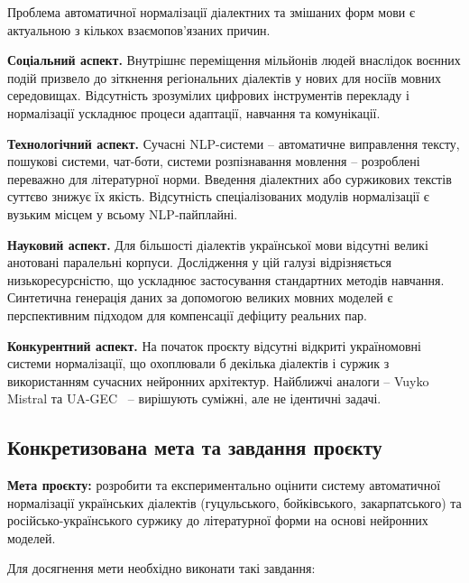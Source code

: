 \documentclass[14pt]{extarticle}
\begin{document}
Проблема автоматичної нормалізації діалектних та змішаних форм мови є актуальною з кількох взаємопов'язаних причин.

\textbf{Соціальний аспект.} Внутрішнє переміщення мільйонів людей внаслідок воєнних подій призвело до зіткнення регіональних діалектів у нових для носіїв мовних середовищах. Відсутність зрозумілих цифрових інструментів перекладу і нормалізації ускладнює процеси адаптації, навчання та комунікації.

\textbf{Технологічний аспект.} Сучасні NLP-системи -- автоматичне виправлення тексту, пошукові системи, чат-боти, системи розпізнавання мовлення -- розроблені переважно для літературної норми. Введення діалектних або суржикових текстів суттєво знижує їх якість. Відсутність спеціалізованих модулів нормалізації є вузьким місцем у всьому NLP-пайплайні.

\textbf{Науковий аспект.} Для більшості діалектів української мови відсутні великі анотовані паралельні корпуси. Дослідження у цій галузі відрізняється низькоресурсністю, що ускладнює застосування стандартних методів навчання. Синтетична генерація даних за допомогою великих мовних моделей є перспективним підходом для компенсації дефіциту реальних пар.

\textbf{Конкурентний аспект.} На початок проєкту відсутні відкриті україномовні системи нормалізації, що охоплювали б декілька діалектів і суржик з використанням сучасних нейронних архітектур. Найближчі аналоги -- Vuyko Mistral та UA-GEC~\cite{uagec} -- вирішують суміжні, але не ідентичні задачі.

\subsection{Конкретизована мета та завдання проєкту}

\textbf{Мета проєкту:} розробити та експериментально оцінити систему автоматичної нормалізації українських діалектів (гуцульського, бойківського, закарпатського) та російсько-українського суржику до літературної форми на основі нейронних моделей.

Для досягнення мети необхідно виконати такі завдання:
\end{document}
